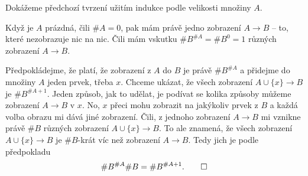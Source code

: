 \begin{enhproof}
 Dokážeme předchozí tvrzení užitím indukce podle velikosti množiny $A$.

 Když je $A$ prázdná, čili $\# A = 0$, pak mám právě jedno zobrazení $A \to B$
 -- to, které nezobrazuje nic na nic. Čili mám vskutku $\# B^{\# A} = \# B^{0} =
 1$ různých zobrazení $A \to B$.

 Předpokládejme, že platí, že zobrazení z $A$ do $B$ je právě $\# B^{\# A}$ a
 přidejme do množiny $A$ jeden prvek, třeba $x$. Chceme ukázat, že všech
 zobrazení $A \cup \{x\} \to B$ je $\# B^{\# A + 1}$. Jeden způsob, jak to
 udělat, je podívat se kolika způsoby můžeme zobrazení $A \to B$
  v $x$. No, $x$ přeci mohu zobrazit na jakýkoliv prvek z $B$ a
 každá volba obrazu mi dává jiné zobrazení. Čili, z jednoho zobrazení $A \to B$
 mi vznikne právě $\# B$ různých zobrazení $A \cup \{x\} \to B$. To ale znamená,
 že všech zobrazení $A \cup \{x\} \to B$ je $\# B$-krát víc než zobrazení $A \to
 B$. Tedy jich je podle předpokladu
 \[
  \# B^{\# A}\# B = \# B^{\#A + 1}.\qedhere
 \]
\end{enhproof}


